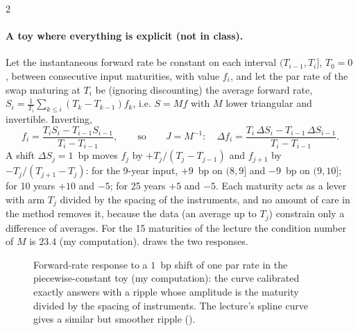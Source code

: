 \begin{paracol}{2}
\paragraph{A toy where everything is explicit (not in class).}\label{ch20:par-toy}
Let the instantaneous forward rate be constant on each interval $(T_{i-1},T_i]$, $T_0=0$, between consecutive input maturities, with value $f_i$, and let the par rate of the swap
maturing at $T_i$ be (ignoring discounting) the average forward rate, $S_i=\frac1{T_i}\sum_{k\le i}(T_k-T_{k-1})f_k$, i.e. $S=Mf$ with $M$ lower triangular
and invertible. Inverting,
\[
  f_i=\frac{T_iS_i-T_{i-1}S_{i-1}}{T_i-T_{i-1}},\qquad\text{so}\qquad J=M^{-1}:\quad \Delta f_i=\frac{T_i\,\Delta S_i-T_{i-1}\,\Delta S_{i-1}}{T_i-T_{i-1}} .
\]
A shift $\Delta S_j=1$~bp moves $f_j$ by $+T_j/(T_j-T_{j-1})$ and $f_{j+1}$ by $-T_j/(T_{j+1}-T_j)$: for the 9-year input, $+9$~bp on $(8,9]$ and $-9$~bp on
$(9,10]$; for 10 years $+10$ and $-5$; for 25 years $+5$ and $-5$. Each maturity acts as a lever with arm $T_j$ divided by the spacing
of the instruments, and no amount of care in the method removes it, because the data (an average up to $T_j$) constrain only a
difference of averages. For the 15 maturities of the lecture the condition number of $M$ is $23.4$ (my computation). 
draws the two responses.

\begin{figure}[ht]
\centering
{}
\caption{Forward-rate response to a $1$~bp shift of one par rate in the piecewise-constant toy (my computation): the curve calibrated exactly answers with a
ripple whose amplitude is the maturity divided by the spacing of instruments. The lecture's spline curve gives a similar but smoother ripple ().}\label{ch20:fig-ripple}
\end{figure}


\end{paracol}
